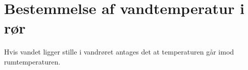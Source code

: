 \section{Bestemmelse af vandtemperatur i rør}
 Hvis vandet ligger stille i vandrøret antages det at temperaturen går imod rumtemperaturen. 